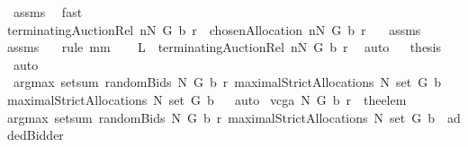 \begin{isabellebody}
\ assms{\isacharparenleft}{}{\isacharparenright}\ \isamarkupfalse%
\ fast\ \isamarkupfalse%
\ \isanewline
{\isachardoublequoteopen}terminatingAuctionRel\ {\isacharparenleft}{\isacharquery}n{\isasymunion}N{\isacharparenright}\ G\ b\ r\ {\isacharequal}\ {\isacharbraceleft}chosenAllocation{\isacharprime}\ {\isacharparenleft}{\isacharquery}n{\isasymunion}N{\isacharparenright}\ G\ b\ r{\isacharbraceright}{\isachardoublequoteclose}\ \isamarkupfalse%
\ {}\ assms{\isacharparenleft}{}{\isacharparenright}\ \isanewline
assms{\isacharparenleft}{}{\isacharparenright}\ {}\ \isamarkupfalse%
\ {\isacharparenleft}rule\ mm{}{}{\isacharparenright}\ \isamarkupfalse%
\ \isamarkupfalse%
\ {\isachardoublequoteopen}{\isacharquery}L\ {\isacharequal}\ terminatingAuctionRel\ {\isacharparenleft}{\isacharquery}n{\isasymunion}N{\isacharparenright}\ G\ b\ r{\isachardoublequoteclose}\ \isamarkupfalse%
\ auto\isanewline
{}\isamarkupfalse%
\ \isamarkupfalse%
\ {\isacharquery}thesis\ \isamarkupfalse%
\ auto\isanewline
{}\isamarkupfalse%
%
\endisatagproof
{\isafoldproof}%
%
\isadelimproof
%
\endisadelimproof
\isanewline
\isanewline
{}\isamarkupfalse%
\ {\isachardoublequoteopen}argmax\ {\isacharparenleft}setsum\ {\isacharparenleft}randomBids{\isacharprime}\ N\ G\ b\ r{\isacharparenright}{\isacharparenright}\ {\isacharparenleft}maximalStrictAllocations{\isacharprime}\ N\ {\isacharparenleft}set\ G{\isacharparenright}\ b{\isacharparenright}\ {\isasymsubseteq}\ \isanewline
maximalStrictAllocations{\isacharprime}\ N\ {\isacharparenleft}set\ G{\isacharparenright}\ b{\isachardoublequoteclose}%
\isadelimproof
\ %
\endisadelimproof
%
\isatagproof
{}\isamarkupfalse%
\ auto%
\endisatagproof
{\isafoldproof}%
%
\isadelimproof
%
\endisadelimproof
\isanewline
\isanewline
{}\isamarkupfalse%
\ {\isachardoublequoteopen}vcga{\isacharprime}\ N\ G\ b\ r\ {\isacharequal}{\isacharequal}\ {\isacharparenleft}the{\isacharunderscore}elem\isanewline
{\isacharparenleft}argmax\ {\isacharparenleft}setsum\ {\isacharparenleft}randomBids{\isacharprime}\ N\ G\ b\ r{\isacharparenright}{\isacharparenright}\ {\isacharparenleft}maximalStrictAllocations{\isacharprime}\ N\ {\isacharparenleft}set\ G{\isacharparenright}\ b{\isacharparenright}{\isacharparenright}{\isacharparenright}\ {\isacharminus}{\isacharminus}\ addedBidder{\isacharprime}{\isachardoublequoteclose}\isanewline

\end{isabellebody}
